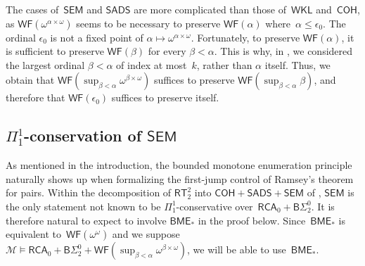 \documentclass{article}
\numberwithin{theorem}{section}
\newtheorem{proposition}[theorem]{Proposition}
\newcommand{\RCA}{\mathsf{RCA}}
\newcommand{\WKL}{\mathsf{WKL}}
\newcommand{\SEM}{\mathsf{SEM}}
\newcommand{\SADS}{\mathsf{SADS}}
\newcommand{\COH}{\mathsf{COH}}
\newcommand{\BSig}{\mathsf{B}\Sigma^0}
\newcommand{\WF}{\mathsf{WF}}
\newcommand{\RT}{\mathsf{RT}}
\newcommand{\BME}{\mathsf{BME}}
\newcommand{\M}{\mathcal{M}}
\newcommand{\ntimes}{\dottimes}
\begin{document}
The cases of~$\SEM$ and $\SADS$ are more complicated than those of~$\WKL$ and~$\COH$, as $\WF(\omega^{\alpha \times \omega})$ seems to be necessary to preserve $\WF(\alpha)$ where~$\alpha \leq \epsilon_0$. The ordinal $\epsilon_0$ is not a fixed point of $\alpha \mapsto \omega^{\alpha \times \omega}$. Fortunately, to preserve $\WF(\alpha)$, it is sufficient to preserve $\WF(\beta)$ for every $\beta < \alpha$. This is why, in , we considered the largest ordinal $\beta < \alpha$ of index at most~$k$, rather than $\alpha$ itself. Thus, we obtain that $\WF(\sup_{\beta < \alpha} \omega^{\beta \times \omega})$ suffices to preserve $\WF(\sup_{\beta < \alpha} \beta)$, and therefore that $\WF(\epsilon_0)$ suffices to preserve itself.


\subsection{$\Pi^1_1$-conservation of $\SEM$}

As mentioned in the introduction, the bounded monotone enumeration principle naturally shows up when formalizing the first-jump control of Ramsey's theorem for pairs. Within the decomposition of $\RT^2_2$ into $\COH + \SADS + \SEM$ of , $\SEM$ is the only statement not known to be $\Pi^1_1$-conservative over~$\RCA_0 + \BSig_2$. It is therefore natural to expect to involve $\BME_*$ in the proof below. Since~$\BME_*$ is equivalent to~$\WF(\omega^\omega)$ and we suppose $\M \models \RCA_0 + \BSig_2 + \WF(\sup_{\beta < \alpha} \omega^{\beta \times \omega})$, we will be able to use~$\BME_*$.

\end{document}
